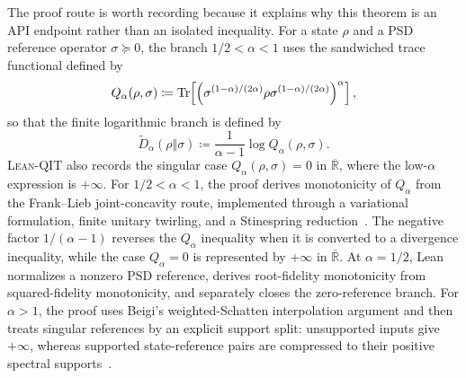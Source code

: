 \documentclass[10pt,a4paper]{article}
\DeclareRobustCommand{\LeanQIT}{\textnormal{\textsc{Lean-QIT}}}
\begin{document}
The proof route is worth recording because it explains why this theorem is an
API endpoint rather than an isolated inequality.  For a state
$\rho$ and a PSD reference operator $\sigma\succeq0$, the branch
$1/2<\alpha<1$ uses the sandwiched trace functional defined by
\begin{equation}
    Q_{\alpha}(\rho,\sigma)
    \coloneqq
    \operatorname{Tr}\!\left[
    \left(
    \sigma^{(1-\alpha)/(2\alpha)}
    \rho
    \sigma^{(1-\alpha)/(2\alpha)}
    \right)^{\alpha}
    \right],
\end{equation}
so that the finite logarithmic branch is defined by
\begin{equation}
    \widetilde D_{\alpha}(\rho\Vert\sigma) \coloneqq
    \frac{1}{\alpha-1}\log Q_{\alpha}(\rho,\sigma).
\end{equation}
\LeanQIT{} also records the singular case $Q_{\alpha}(\rho,\sigma)=0$ in
$\overline{\mathbb R}$, where the low-$\alpha$ expression is $+\infty$. For $1/2<\alpha<1$, the proof derives monotonicity of $Q_\alpha$ from the
Frank--Lieb joint-concavity route, implemented through a variational formulation, finite unitary twirling, and a Stinespring reduction~\cite{FrankLieb2013Renyi}.  The negative factor $1/(\alpha-1)$ reverses the $Q_\alpha$ inequality when it is converted to a divergence inequality, while the case $Q_\alpha=0$ is represented by $+\infty$ in $\overline{\mathbb R}$.  At $\alpha=1/2$, Lean normalizes a nonzero PSD
reference, derives root-fidelity monotonicity from squared-fidelity
monotonicity, and separately closes the zero-reference branch.  For
$\alpha>1$, the proof uses Beigi's weighted-Schatten interpolation argument
and then treats singular references by an explicit support split: unsupported
inputs give $+\infty$, whereas supported state-reference pairs are compressed
to their positive spectral supports~\cite{Beigi2013Sandwiched}.
\end{document}
